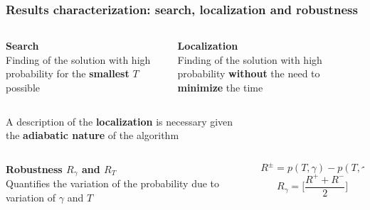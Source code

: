 \documentclass{beamer}
\newcommand{\bb}[1]{\textbf{\textcolor{darkish_blue}{#1}}}
\begin{document}

\begin{frame}
\frametitle{Results characterization: search, localization and robustness}
\vspace{-0.25cm}
\begin{columns}
	\begin{column}[T]{0.4\textwidth}
	\bb{Search}\\Finding of the solution with high probability for the \bb{smallest} $T$ possible

	\end{column}

	\begin{column}[T]{0.4\textwidth}
	\bb{Localization}\\Finding of the solution with high probability \bb{without} the need to \bb{minimize} the time
	
	\end{column}
\end{columns}

\vspace{0.5cm}
\centering
\begin{tcolorbox}[width=9cm, colframe=darkblue, colback=white, halign=center, left=0pt, right =0pt, top=1pt, bottom=1pt]
A description of the \bb{localization} is necessary given\\ the \bb{adiabatic nature} of the algorithm
\end{tcolorbox}
\vspace{0.5cm}

\begin{columns}
	\begin{column}[T]{0.4\textwidth}
		\bb{Robustness $R_\gamma$ and $R_T$} \\Quantifies the variation of the probability due to variation of $\gamma$ and $T$

	\end{column}

	\begin{column}[T]{0.4\textwidth}
		\begin{equation*}
			R^\pm = p(T,\gamma)-p(T, \gamma \pm \delta)
		\end{equation*}
		\begin{equation*}
			R_\gamma = \Big[\frac{R^++R^-}{2}\Big]
		\end{equation*}
	
	\end{column}
\end{columns}

\end{frame}
\end{document}
